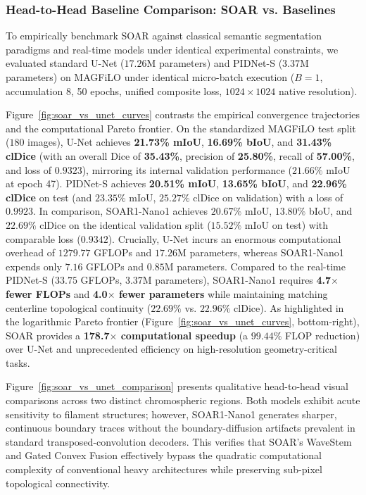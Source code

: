 \documentclass[11pt,a4paper]{article}
\begin{document}
\subsubsection{Head-to-Head Baseline Comparison: SOAR vs. Baselines}
To empirically benchmark SOAR against classical semantic segmentation paradigms and real-time models under identical experimental constraints, we evaluated standard U-Net \cite{ronneberger2015u} ($17.26$M parameters) and PIDNet-S \cite{xu2023pidnet} ($3.37$M parameters) on MAGFiLO under identical micro-batch execution ($B=1$, accumulation 8, 50 epochs, unified composite loss, $1024\times 1024$ native resolution).

Figure~\ref{fig:soar_vs_unet_curves} contrasts the empirical convergence trajectories and the computational Pareto frontier. On the standardized MAGFiLO test split ($180$ images), U-Net achieves \textbf{21.73\% mIoU}, \textbf{16.69\% bIoU}, and \textbf{31.43\% clDice} (with an overall Dice of \textbf{35.43\%}, precision of \textbf{25.80\%}, recall of \textbf{57.00\%}, and loss of $0.9323$), mirroring its internal validation performance ($21.66\%$ mIoU at epoch 47). PIDNet-S achieves \textbf{20.51\% mIoU}, \textbf{13.65\% bIoU}, and \textbf{22.96\% clDice} on test (and $23.35\%$ mIoU, $25.27\%$ clDice on validation) with a loss of $0.9923$. In comparison, SOAR1-Nano1 achieves $20.67\%$ mIoU, $13.80\%$ bIoU, and $22.69\%$ clDice on the identical validation split ($15.52\%$ mIoU on test) with comparable loss ($0.9342$). Crucially, U-Net incurs an enormous computational overhead of $1279.77$ GFLOPs and $17.26$M parameters, whereas SOAR1-Nano1 expends only $7.16$ GFLOPs and $0.85$M parameters. Compared to the real-time PIDNet-S ($33.75$ GFLOPs, $3.37$M parameters), SOAR1-Nano1 requires \textbf{4.7$\times$ fewer FLOPs} and \textbf{4.0$\times$ fewer parameters} while maintaining matching centerline topological continuity ($22.69\%$ vs. $22.96\%$ clDice). As highlighted in the logarithmic Pareto frontier (Figure~\ref{fig:soar_vs_unet_curves}, bottom-right), SOAR provides a \textbf{178.7$\times$ computational speedup} (a $99.44\%$ FLOP reduction) over U-Net and unprecedented efficiency on high-resolution geometry-critical tasks.

Figure~\ref{fig:soar_vs_unet_comparison} presents qualitative head-to-head visual comparisons across two distinct chromospheric regions. Both models exhibit acute sensitivity to filament structures; however, SOAR1-Nano1 generates sharper, continuous boundary traces without the boundary-diffusion artifacts prevalent in standard transposed-convolution decoders. This verifies that SOAR's WaveStem and Gated Convex Fusion effectively bypass the quadratic computational complexity of conventional heavy architectures while preserving sub-pixel topological connectivity.
\end{document}
